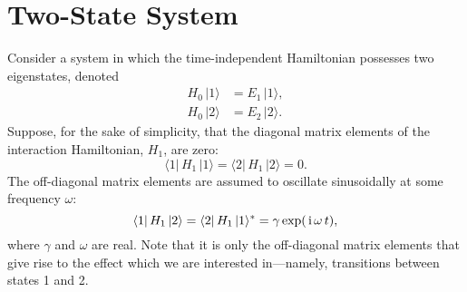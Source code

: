 \section{Two-State System}
Consider a system in which the time-independent Hamiltonian 
possesses two eigenstates, denoted
\begin{align}
H_0 \,|1\rangle &= E_1\, |1\rangle, \\[0.5ex]
H_0 \,|2\rangle &= E_2 \,|2\rangle.
\end{align}
Suppose, for the sake of simplicity, that the diagonal matrix
elements of the interaction Hamiltonian, $H_1$, are zero:
\begin{equation}
\langle 1|\,H_1\,|1\rangle = \langle 2|\,H_1\,|2\rangle = 0.
\end{equation}
The off-diagonal matrix elements are assumed to oscillate sinusoidally
at some frequency $\omega$:
\begin{equation}
\langle 1|\,H_1\,|2\rangle = \langle 2|\,H_1\,|1\rangle^\ast = \gamma \exp(\,{\rm i}\,
\omega\,t),
\end{equation}
where $\gamma$ and $\omega$ are real. 
Note that it is only the off-diagonal matrix elements that give rise to
the effect which we are interested in---namely, transitions between states
1 and 2.

